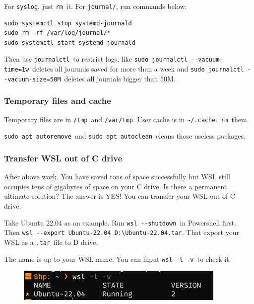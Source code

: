 \documentclass[12pt]{ctexart}
\newenvironment{mdquote}
{%
  \par\noindent
  \begin{list}{}{%
      \setlength{\leftmargin}{1em}%
      \setlength{\rightmargin}{0pt}%
      \setlength{\itemindent}{0pt}%
      \setlength{\listparindent}{\parindent}%
      \setlength{\topsep}{0.5\baselineskip}%
  }
  \item[\textbf{>}\ ]\itshape
}
{\end{list}\par}
\begin{document}
For \texttt{syslog}, just \texttt{rm}\ it. For \texttt{journal/}, run
commands below:

\begin{adjustwidth}{2em}{0pt}
\begin{verbatim}
sudo systemctl stop systemd-journald
sudo rm -rf /var/log/journal/*
sudo systemctl start systemd-journald
\end{verbatim}
\end{adjustwidth}

Then use \texttt{journalctl}\ to restrict logs, like
\texttt{sudo\ journalctl\ -\/-vacuum-time=1w}\ deletes all journals saved
for more than a week and \texttt{sudo\ journalctl\ -\/-vacuum-size=50M}\
deletes all journals bigger than 50M.

\subsubsection*{\textbf{Temporary files and cache}}

Temporary files are in \texttt{/tmp}\ and \texttt{/var/tmp}. User cache
is in \texttt{\textasciitilde{}/.cache}.\ \texttt{rm}\ them.

\texttt{sudo\ apt\ autoremove}\ and \texttt{sudo\ apt\ autoclean}\ cleans
those useless packages.

\subsubsection{\textbf{Transfer WSL out of C drive}}

After above work. You have saved tons of space successfully but WSL
still occupies tens of gigabytes of space on your C drive. Is there a
permanent ultimate solution? The answer is YES! You can transfer your
WSL out of C drive.

Take Ubuntu 22.04 as an example. Run \texttt{wsl\ -\/-shutdown}\ in
Powershell first. Then
\texttt{wsl\ -\/-export\ Ubuntu-22.04\ D:\textbackslash{}Ubuntu-22.04.tar}.
That export your WSL as a \texttt{.tar}\ file to D drive.

\begin{mdquote}
The name is up to your WSL name. You can input \texttt{wsl\ -l\ -v}\ to
check it.
\begin{figure}[H]
    \centering
    \includegraphics[width=0.9\textwidth,keepaspectratio]{assets/Linux/2.4 No, the C drive is almost full!/2.png}
\end{figure}
\end{mdquote}
\end{document}
